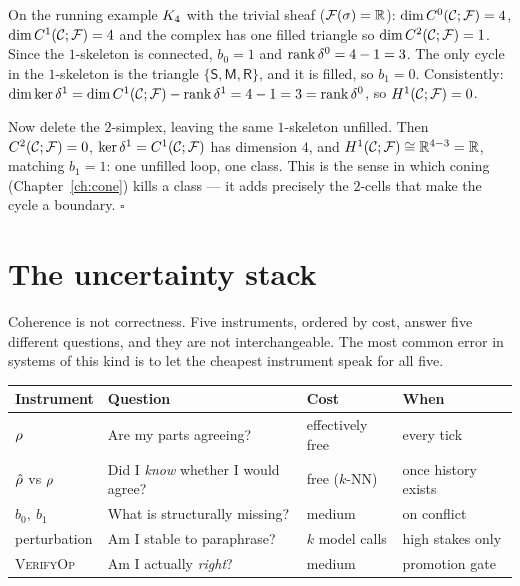 \begin{workedbox}\Worked
On the running example $K_4$ with the trivial sheaf
($\mathcal{F}(\sigma)=\mathbb{R}$): $\dim C^{0}(\mathcal{C};\mathcal{F})=4$, $\dim C^{1}(\mathcal{C};\mathcal{F})=4$ and the complex has
one filled triangle so $\dim C^{2}(\mathcal{C};\mathcal{F})=1$. Since the $1$-skeleton is
connected, $b_0=1$ and $\operatorname{rank}\delta^0=4-1=3$. The only cycle in the
$1$-skeleton is the triangle $\{\mathsf S,\mathsf M,\mathsf R\}$, and it
is filled, so $b_1=0$. Consistently:
$\dim\ker\delta^1=\dim C^{1}(\mathcal{C};\mathcal{F})-\operatorname{rank}\delta^1=4-1=3=\operatorname{rank}\delta^0$, so
$H^{1}(\mathcal{C};\mathcal{F})=0$.

Now delete the $2$-simplex, leaving the same $1$-skeleton unfilled. Then
$C^{2}(\mathcal{C};\mathcal{F})=0$, $\ker\delta^1=C^{1}(\mathcal{C};\mathcal{F})$ has dimension $4$, and
$H^{1}(\mathcal{C};\mathcal{F})\cong\mathbb{R}^{4-3}=\mathbb{R}$, matching $b_1=1$: one unfilled loop, one
class. This is the sense in which coning (Chapter~\ref{ch:cone}) kills
a class --- it adds precisely the $2$-cells that make the cycle a
boundary.
\hfill$\square$
\end{workedbox}

\section{The uncertainty stack}\label{sec:uncert}

\begin{intu}\Intu
Coherence is not correctness. Five instruments, ordered by cost, answer
five different questions, and they are not interchangeable. The most
common error in systems of this kind is to let the cheapest instrument
speak for all five.
\end{intu}

\begin{center}
\renewcommand{\arraystretch}{1.3}
\begin{tabular}{@{}p{2.7cm}p{5.2cm}p{2.5cm}p{2.9cm}@{}}
\toprule
\textbf{Instrument} & \textbf{Question} & \textbf{Cost} & \textbf{When}\\
\midrule
$\rho$ & Are my parts agreeing? & effectively free & every tick\\
$\hat{\rho}$ vs $\rho$ & Did I \emph{know} whether I would agree? & free ($k$-NN) & once history exists\\
$b_0,\ b_1$ & What is structurally missing? & medium & on conflict\\
perturbation & Am I stable to paraphrase? & $k$ model calls & high stakes only\\
\textsc{VerifyOp} & Am I actually \emph{right}? & medium & promotion gate\\
\bottomrule
\end{tabular}
\end{center}


